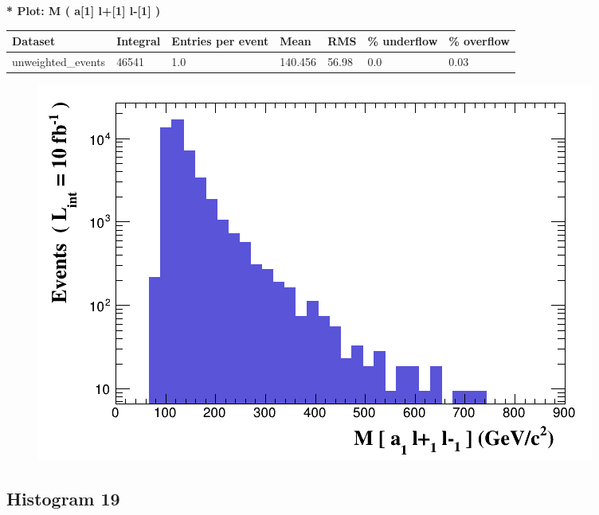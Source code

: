 \documentclass[a4paper, 10pt]{article}
\begin{document}
\textbf{* Plot: M ( a[1] l+[1] l-[1] ) }\\
   \begin{table}[H]
  \begin{center}
    \begin{tabular}{|m{23.0mm}|m{23.0mm}|m{18.0mm}|m{19.0mm}|m{19.0mm}|m{19.0mm}|m{19.0mm}|}
      \hline
      {\cellcolor{yellow}         Dataset}& {\cellcolor{yellow}         Integral}& {\cellcolor{yellow}         Entries per event}& {\cellcolor{yellow}         Mean}& {\cellcolor{yellow}         RMS}& {\cellcolor{yellow}         \% underflow}& {\cellcolor{yellow}         \% overflow}\\
      \hline
      {\cellcolor{white}         unweighted\_events}& {\cellcolor{white}         46541}& {\cellcolor{white}         1.0}& {\cellcolor{white}         140.456}& {\cellcolor{white}         56.98}& {\cellcolor{green}         0.0}& {\cellcolor{green}         0.03}\\
\hline
    \end{tabular}
  \end{center}
\end{table}

\begin{figure}[H]
  \begin{center}
    \includegraphics[scale=0.45]{selection_17.png}\\
\caption{   }
  \end{center}
\end{figure}
      \newpage
\subsection{ Histogram 19}
\end{document}
